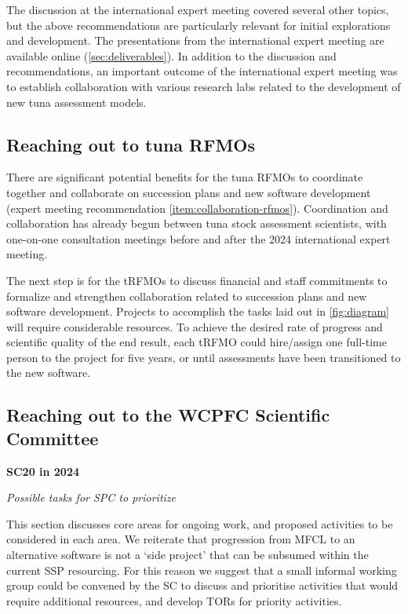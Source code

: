 \documentclass{SCreport}
\begin{document}
The discussion at the international expert meeting covered several other topics,
but the above recommendations are particularly relevant for initial explorations
and development. The presentations from the international expert meeting are
available online (\autoref{sec:deliverables}). In addition to the discussion and
recommendations, an important outcome of the international expert meeting was to
establish collaboration with various research labs related to the development of
new tuna assessment models.

\subsection{Reaching out to tuna RFMOs}

There are significant potential benefits for the tuna RFMOs to coordinate
together and collaborate on succession plans and new software development
(expert meeting recommendation \ref{item:collaboration-rfmos}). Coordination and
collaboration has already begun between tuna stock assessment scientists, with
one-on-one consultation meetings before and after the 2024 international expert
meeting.

The next step is for the tRFMOs to discuss financial and staff commitments to
formalize and strengthen collaboration related to succession plans and new
software development. Projects to accomplish the tasks laid out in
\autoref{fig:diagram} will require considerable resources. To achieve the
desired rate of progress and scientific quality of the end result, each tRFMO
could hire/assign one full-time person to the project for five years, or until
assessments have been transitioned to the new software.

\subsection{Reaching out to the WCPFC Scientific Committee}

\textbf{SC20 in 2024}

\textit{Possible tasks for SPC to prioritize}

This section discusses core areas for ongoing work, and proposed activities to
be considered in each area. We reiterate that progression from MFCL to an
alternative software is not a `side project' that can be subsumed within the
current SSP resourcing. For this reason we suggest that a small informal working
group could be convened by the SC to discuss and prioritise activities that
would require additional resources, and develop TORs for priority activities.
\end{document}
